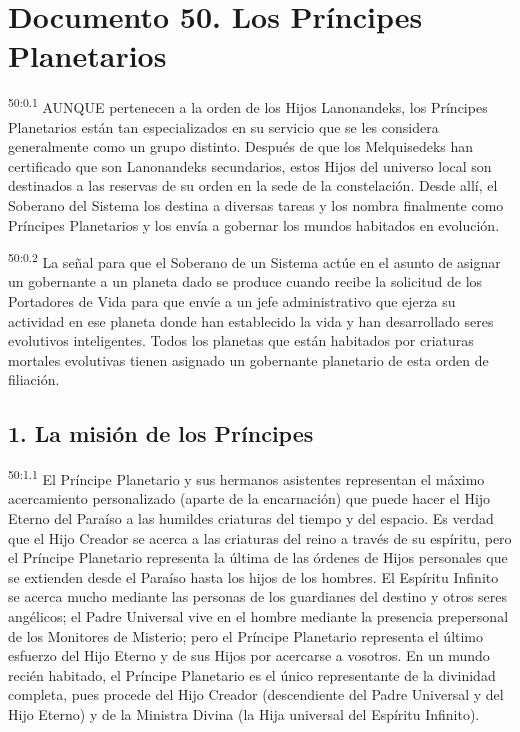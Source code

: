 \chapter{Documento 50. Los Príncipes Planetarios}
\par
\textsuperscript{50:0.1} AUNQUE pertenecen a la orden de los Hijos Lanonandeks, los Príncipes Planetarios están tan especializados en su servicio que se les considera generalmente como un grupo distinto. Después de que los Melquisedeks han certificado que son Lanonandeks secundarios, estos Hijos del universo local son destinados a las reservas de su orden en la sede de la constelación. Desde allí, el Soberano del Sistema los destina a diversas tareas y los nombra finalmente como Príncipes Planetarios y los envía a gobernar los mundos habitados en evolución.

\par
\textsuperscript{50:0.2} La señal para que el Soberano de un Sistema actúe en el asunto de asignar un gobernante a un planeta dado se produce cuando recibe la solicitud de los Portadores de Vida para que envíe a un jefe administrativo que ejerza su actividad en ese planeta donde han establecido la vida y han desarrollado seres evolutivos inteligentes. Todos los planetas que están habitados por criaturas mortales evolutivas tienen asignado un gobernante planetario de esta orden de filiación.

\section*{1. La misión de los Príncipes}
\par
\textsuperscript{50:1.1} El Príncipe Planetario y sus hermanos asistentes representan el máximo acercamiento personalizado (aparte de la encarnación) que puede hacer el Hijo Eterno del Paraíso a las humildes criaturas del tiempo y del espacio. Es verdad que el Hijo Creador se acerca a las criaturas del reino a través de su espíritu, pero el Príncipe Planetario representa la última de las órdenes de Hijos personales que se extienden desde el Paraíso hasta los hijos de los hombres. El Espíritu Infinito se acerca mucho mediante las personas de los guardianes del destino y otros seres angélicos; el Padre Universal vive en el hombre mediante la presencia prepersonal de los Monitores de Misterio; pero el Príncipe Planetario representa el último esfuerzo del Hijo Eterno y de sus Hijos por acercarse a vosotros. En un mundo recién habitado, el Príncipe Planetario es el único representante de la divinidad completa, pues procede del Hijo Creador (descendiente del Padre Universal y del Hijo Eterno) y de la Ministra Divina (la Hija universal del Espíritu Infinito).

